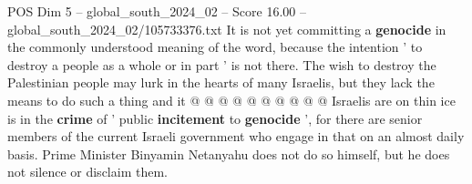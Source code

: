 \begin{textsample}{POS Dim 5 – global\_south\_2024\_02 – Score 16.00 – global\_south\_2024\_02/105733376.txt}
It is not yet committing a \textbf{genocide} in the commonly understood meaning of the word, because the intention ' to destroy a people as a whole or in part ' is not there.
The wish to destroy the Palestinian people may lurk in the hearts of many Israelis, but they lack the means to do such a thing and it @ @ @ @ @ @ @ @ @ @ Israelis are on thin ice is in the \textbf{crime} of ' public \textbf{incitement} to \textbf{genocide} ', for there are senior members of the current Israeli government who engage in that on an almost daily basis.
Prime Minister Binyamin Netanyahu does not do so himself, but he does not silence or disclaim them.

\end{textsample}
